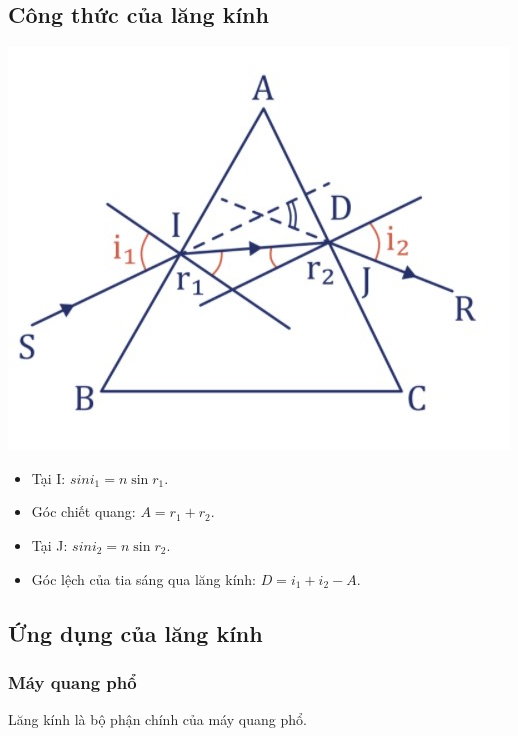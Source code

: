 \subsection{Công thức của lăng kính}
\begin{center}
	\includegraphics[scale=0.5]{../figs/VN11-PH-37-L-025-1-h1.jpg}
\end{center}
\begin{itemize}
\item Tại I: $sin i_1=n\sin r_1$.
\item Góc chiết quang: $A=r_1+r_2$.
\item Tại J: $sin i_2=n\sin r_2$.
\item Góc lệch của tia sáng qua lăng kính: $D=i_1+i_2-A$.
\end{itemize}
	

\subsection{Ứng dụng của lăng kính}
\subsubsection{Máy quang phổ}
Lăng kính là bộ phận chính của máy quang phổ.
